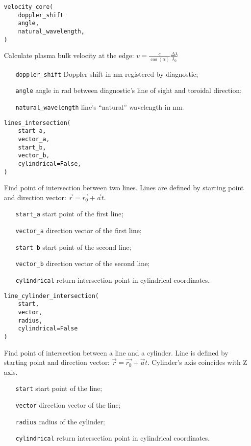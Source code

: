 \documentclass[../../main.tex]{subfiles}
\begin{document}
\begin{verbatim}
velocity_core(
    doppler_shift
    angle,
    natural_wavelength,
)
\end{verbatim}

Calculate plasma bulk velocity at the edge:
$v = \frac{c}{\cos(\alpha)} \frac{\Delta \lambda}{\lambda_0}$

\begin{itemize}[align=left]
    \item[\texttt{doppler\_shift}] Doppler shift in nm registered by diagnostic;
    \item[\texttt{angle}] angle in rad between diagnostic's line of sight and toroidal direction;
    \item[\texttt{natural\_wavelength}] line's \enquote{natural} wavelength in nm.
\end{itemize}

\begin{verbatim}
lines_intersection(
    start_a,
    vector_a,
    start_b,
    vector_b,
    cylindrical=False,
)
\end{verbatim}

Find point of intersection between two lines. Lines are defined by starting point and direction vector: $\vec{r} = \vec{r_0} + \vec{a}t$.

\begin{itemize}[align=left]
    \item[\texttt{start\_a}] start point of the first line;
    \item[\texttt{vector\_a}] direction vector of the first line;
    \item[\texttt{start\_b}] start point of the second line;
    \item[\texttt{vector\_b}] direction vector of the second line;
    \item[\texttt{cylindrical}] return intersection point in cylindrical coordinates.
\end{itemize}

\begin{verbatim}
line_cylinder_intersection(
    start, 
    vector, 
    radius, 
    cylindrical=False
)
\end{verbatim}

Find point of intersection between a line and a cylinder. Line is defined by starting point and direction vector: $\vec{r} = \vec{r_0} + \vec{a}t$. Cylinder's axis coincides with Z axis.

\begin{itemize}[align=left]
    \item[\texttt{start}] start point of the line;
    \item[\texttt{vector}] direction vector of the line;
    \item[\texttt{radius}] radius of the cylinder;
    \item[\texttt{cylindrical}] return intersection point in cylindrical coordinates.
\end{itemize}
\end{document}
